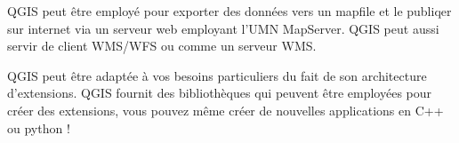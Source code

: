 


QGIS peut \^etre employ\'e pour exporter des donn\'ees vers un mapfile et le publiqer sur internet via un serveur web employant l'UMN MapServer. QGIS peut aussi servir de client WMS/WFS ou comme un serveur WMS.




QGIS peut \^etre adapt\'ee \`a vos besoins particuliers du fait de son architecture d'extensions. QGIS fournit des biblioth\`eques qui peuvent \^etre employ\'ees pour cr\'eer des extensions, vous pouvez m\^eme cr\'eer de nouvelles applications en C++ ou python !


